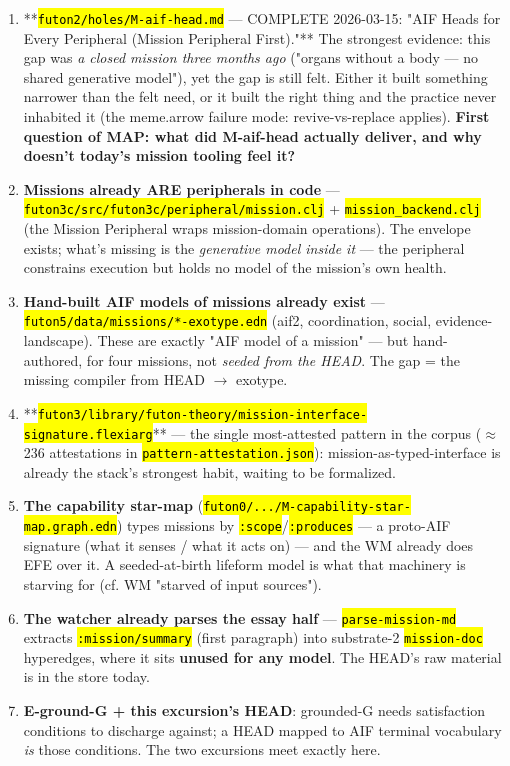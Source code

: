 \documentclass[11pt,oneside]{article}
\newcommand{\scopehl}[1]{\texttt{\hl{#1}}}
\begin{document}
\begin{phasebox}[title={1. IDENTIFY}]
\begin{subbox}[title={Where the gap is already palpable in the stack (evidence pass, 2026-06-10)}]
\begin{enumerate}[leftmargin=1.4em,itemsep=1pt]
\item **\scopehl{futon2/holes/M-aif-head.md} --- COMPLETE 2026-03-15: "AIF Heads for Every Peripheral (Mission Peripheral First)."** The strongest evidence: this gap was \emph{a closed mission three months ago} ("organs without a body --- no shared generative model"), yet the gap is still felt. Either it built something narrower than the felt need, or it built the right thing and the practice never inhabited it (the meme.arrow failure mode: revive-vs-replace applies). \textbf{First question of MAP: what did M-aif-head actually deliver, and why doesn't today's mission tooling feel it?}
\item \textbf{Missions already ARE peripherals in code} --- \scopehl{futon3c/src/futon3c/peripheral/mission.clj} + \scopehl{mission\_backend.clj} (the Mission Peripheral wraps mission-domain operations). The envelope exists; what's missing is the \emph{generative model inside it} --- the peripheral constrains execution but holds no model of the mission's own health.
\item \textbf{Hand-built AIF models of missions already exist} --- \scopehl{futon5/data/missions/*-exotype.edn} (aif2, coordination, social, evidence-landscape). These are exactly "AIF model of a mission" --- but hand-authored, for four missions, not \emph{seeded from the HEAD}. The gap = the missing compiler from HEAD $\rightarrow$ exotype.
\item **\scopehl{futon3/library/futon-theory/mission-interface-signature.flexiarg}** --- the single most-attested pattern in the corpus ($\approx$236 attestations in \scopehl{pattern-attestation.json}): mission-as-typed-interface is already the stack's strongest habit, waiting to be formalized.
\item \textbf{The capability star-map} (\scopehl{futon0/.../M-capability-star-map.graph.edn}) types missions by \scopehl{:scope}/\scopehl{:produces} --- a proto-AIF signature (what it senses / what it acts on) --- and the WM already does EFE over it. A seeded-at-birth lifeform model is what that machinery is starving for (cf. WM "starved of input sources").
\item \textbf{The watcher already parses the essay half} --- \scopehl{parse-mission-md} extracts \scopehl{:mission/summary} (first paragraph) into substrate-2 \scopehl{mission-doc} hyperedges, where it sits \textbf{unused for any model}. The HEAD's raw material is in the store today.
\item \textbf{E-ground-G + this excursion's HEAD}: grounded-G needs satisfaction conditions to discharge against; a HEAD mapped to AIF terminal vocabulary \emph{is} those conditions. The two excursions meet exactly here.

\end{enumerate}
\end{subbox}
\end{phasebox}
\end{document}
